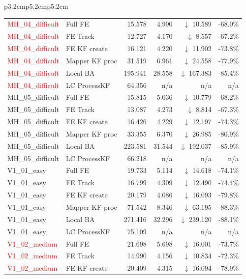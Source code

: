 \documentclass[11pt]{article}
\begin{document}
\begin{table}[ht]
\begin{tabular}{p{3.2cm}p{5.2cm}p{5.2cm}}
\begin{longtable}{llrrrr}
\textcolor{red}{MH\_04\_difficult} & Full FE & 15.578 & 4.990 & $\downarrow$ 10.589 & -68.0\% \\
\textcolor{red}{MH\_04\_difficult} & FE Track & 12.727 & 4.170 & $\downarrow$ 8.557 & -67.2\% \\
\textcolor{red}{MH\_04\_difficult} & FE KF create & 16.121 & 4.220 & $\downarrow$ 11.902 & -73.8\% \\
\textcolor{red}{MH\_04\_difficult} & Mapper KF proc & 31.519 & 6.961 & $\downarrow$ 24.558 & -77.9\% \\
\textcolor{red}{MH\_04\_difficult} & Local BA & 195.941 & 28.558 & $\downarrow$ 167.383 & -85.4\% \\
\textcolor{red}{MH\_04\_difficult} & LC ProcessKF & 64.356 & n/a & n/a & n/a \\
MH\_05\_difficult & Full FE & 15.815 & 5.036 & $\downarrow$ 10.779 & -68.2\% \\
MH\_05\_difficult & FE Track & 13.087 & 4.273 & $\downarrow$ 8.814 & -67.3\% \\
MH\_05\_difficult & FE KF create & 16.426 & 4.229 & $\downarrow$ 12.197 & -74.3\% \\
MH\_05\_difficult & Mapper KF proc & 33.355 & 6.370 & $\downarrow$ 26.985 & -80.9\% \\
MH\_05\_difficult & Local BA & 223.581 & 31.544 & $\downarrow$ 192.037 & -85.9\% \\
MH\_05\_difficult & LC ProcessKF & 66.218 & n/a & n/a & n/a \\
V1\_01\_easy & Full FE & 19.733 & 5.114 & $\downarrow$ 14.618 & -74.1\% \\
V1\_01\_easy & FE Track & 16.799 & 4.309 & $\downarrow$ 12.490 & -74.4\% \\
V1\_01\_easy & FE KF create & 20.179 & 4.086 & $\downarrow$ 16.093 & -79.8\% \\
V1\_01\_easy & Mapper KF proc & 71.542 & 8.346 & $\downarrow$ 63.195 & -88.3\% \\
V1\_01\_easy & Local BA & 271.416 & 32.296 & $\downarrow$ 239.120 & -88.1\% \\
V1\_01\_easy & LC ProcessKF & 75.109 & n/a & n/a & n/a \\
\textcolor{red}{V1\_02\_medium} & Full FE & 21.698 & 5.698 & $\downarrow$ 16.001 & -73.7\% \\
\textcolor{red}{V1\_02\_medium} & FE Track & 14.990 & 4.156 & $\downarrow$ 10.834 & -72.3\% \\
\textcolor{red}{V1\_02\_medium} & FE KF create & 20.409 & 4.315 & $\downarrow$ 16.094 & -78.9\% \\

\end{longtable}
\end{tabular}
\end{table}
\end{document}
